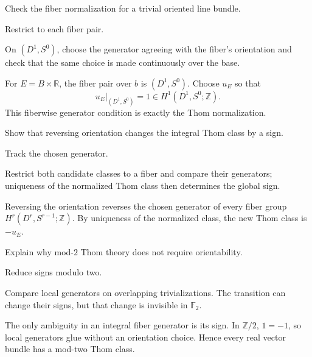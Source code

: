 \begin{exercise}\label{exr:viii31-03}
Check the fiber normalization for a trivial oriented line bundle.
\end{exercise}
\begin{hint}
Restrict to each fiber pair.

On \((D^1,S^0)\), choose the generator agreeing with the fiber's orientation and check that the same choice is made continuously over the base.
\end{hint}
\begin{solution}
For \(E=B\times\mathbb R\), the fiber pair over \(b\) is \((D^1,S^0)\). Choose \(u_E\) so that
\[
u_E|_{(D^1,S^0)}=1\in H^1(D^1,S^0;\mathbb Z).
\]
This fiberwise generator condition is exactly the Thom normalization.
\end{solution}

\begin{exercise}\label{exr:viii31-04}
Show that reversing orientation changes the integral Thom class by a sign.
\end{exercise}
\begin{hint}
Track the chosen generator.

Restrict both candidate classes to a fiber and compare their generators; uniqueness of the normalized Thom class then determines the global sign.
\end{hint}
\begin{solution}
Reversing the orientation reverses the chosen generator of every fiber group \(H^r(D^r,S^{r-1};\mathbb Z)\). By uniqueness of the normalized class, the new Thom class is \(-u_E\).
\end{solution}

\begin{exercise}\label{exr:viii31-05}
Explain why mod-$2$ Thom theory does not require orientability.
\end{exercise}
\begin{hint}
Reduce signs modulo two.

Compare local generators on overlapping trivializations. The transition can change their signs, but that change is invisible in \(\mathbb F_2\).
\end{hint}
\begin{solution}
The only ambiguity in an integral fiber generator is its sign. In \(\mathbb Z/2\), \(1=-1\), so local generators glue without an orientation choice. Hence every real vector bundle has a mod-two Thom class.
\end{solution}

